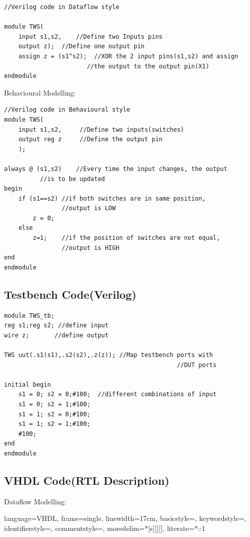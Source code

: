\documentclass[12pt]{article}
\begin{document}
\begin{lstlisting}[style =verilog-style]
//Verilog code in Dataflow style

module TWS(
	input s1,s2,	//Define two Inputs pins
	output z);	//Define one output pin
	assign z = (s1^s2);  //XOR the 2 input pins(s1,s2) and assign  
	                   //the output to the output pin(X1)
endmodule

\end{lstlisting}
\newpage
\noindent Behavioural Modelling:
\begin{lstlisting}[style = verilog-style]
//Verilog code in Behavioural style
module TWS(
	input s1,s2,   	 //Define two inputs(switches)
	output reg z	 //Define the output pin
	);
	
always @ (s1,s2)    //Every time the input changes, the output
		  //is to be updated
begin
	if (s1==s2) //if both switches are in same position, 
	            //output is LOW
		z = 0;
	else
		z=1;	//if the position of switches are not equal, 
		        //output is HIGH
end
endmodule

\end{lstlisting}

\subsection{Testbench Code(Verilog)}
\begin{lstlisting}[style=verilog-style]
module TWS_tb;
reg s1;reg s2; //define input
wire z;       //define output

TWS uut(.s1(s1),.s2(s2),.z(z)); //Map testbench ports with 
                                                //DUT ports

initial begin
	s1 = 0; s2 = 0;#100;  //different combinations of input
	s1 = 0; s2 = 1;#100;
	s1 = 1; s2 = 0;#100;
	s1 = 1; s2 = 1;#100;
	#100;
end
endmodule 
\end{lstlisting}
\newpage
\subsection{VHDL Code(RTL Description)}
\noindent Dataflow Modelling:


{
    language=VHDL,
    frame=single,
    linewidth=17cm,
    basicstyle=\small\ttfamily,
    keywordstyle=\color{vblue},
    identifierstyle=\color{black},
    commentstyle=\color{vgreen},
    moredelim=*[s][]{[}{]},
    literate=*{:}{:}1
}
\end{document}
